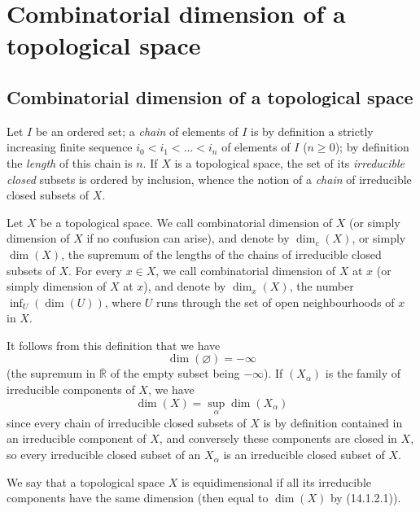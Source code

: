 \setcounter{section}{13}
\section{Combinatorial dimension of a topological space}
\label{section:0.14}

\setcounter{subsection}{0}
\subsection{Combinatorial dimension of a topological space}
\label{subsection:0.14.1}

\begin{env}[14.1.1]
\label{0.14.1.1}
Let $I$ be an ordered set; a \emph{chain} of elements of $I$ is by
definition a strictly increasing finite sequence
$i_0<i_1<\ldots<i_n$ of elements of $I$ ($n\geq 0$); by definition the
\emph{length} of this chain is $n$. If $X$ is a topological space,
the set of its \emph{irreducible closed} subsets is ordered by
inclusion, whence the notion of a \emph{chain} of irreducible closed subsets of
$X$.
\end{env}

\begin{definition}[14.1.2]
\label{0.14.1.2}
Let $X$ be a topological space. We call combinatorial dimension of
$X$ \textup{(or simply} dimension of $X$ \textup{if no confusion can
arise)}, and denote by $\dim_c(X)$, or simply $\dim(X)$, the
supremum of the lengths of the chains of irreducible closed subsets of $X$.
For every $x\in X$, we call combinatorial dimension of $X$ at $x$
\textup{(or simply} dimension of $X$ at $x$), and denote by $\dim_x(X)$, the
number $\inf_U(\dim(U))$, where $U$ runs through the set of open neighbourhoods of
$x$ in $X$.
\end{definition}

It follows from this definition that we have
\[
  \dim(\varnothing)=-\infty
\]
(the supremum in $\overline{\mathbb R}$ of the empty subset being
$-\infty$). If $(X_\alpha)$ is the family of irreducible components of
$X$, we have
\[
  \dim(X)=\sup_\alpha\dim(X_\alpha)
  \tag{14.1.2.1}\label{0.14.1.2.1}
\]
since every chain of irreducible closed subsets of $X$ is by definition
contained in an irreducible component of $X$, and conversely these
components are closed in $X$, so every irreducible closed subset of an
$X_\alpha$ is an irreducible closed subset of $X$.

\begin{definition}[14.1.3]
\label{0.14.1.3}
We say that a topological space $X$ is equidimensional if all its
irreducible components have the same dimension \textup{(then equal to $\dim(X)$ by
(14.1.2.1))}.
\end{definition}

